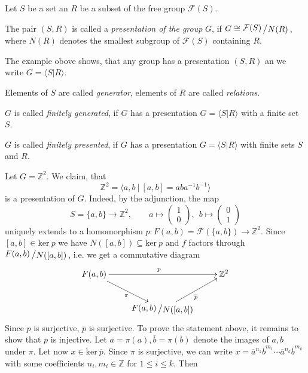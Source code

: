 \documentclass[11pt]{book}
\numberwithin{dummy}{section}
\theoremstyle{nonumberbreak}
\newenvironment{defin}[1][]{\ifthenelse{\equal{#1}{}}{\definition}{\definition[#1]}\rm}{\enddefinition}
\newenvironment{ex}[1][]{\ifthenelse{\equal{#1}{}}{\example}{\example[#1]}\rm}{\endexample}
\newcommand{\kernel}{\mathrm{ker}\ }
\newcommand{\F}{\mathcal{F}}
\newcommand{\la}{\longrightarrow}
\newcommand{\slant}[2]{{\raisebox{.1em}{$#1$}\left/\raisebox{-.1em}{$#2$}\right.}}
\begin{document}
\begin{spacing}{1.4}
\begin{defin}   %
Let $S$ be a set an $R$ be a subset of the free group $\F(S)$.
\begin{compactenum}
\item The pair $(S,R)$ is called a \textit{presentation of the group} $G$, if $G \cong \slant{\F(S)}{N(R)}$, where $N(R)$ denotes the smallest subgroup of $\F(S)$ containing $R$.
\item The example obove shows, that any group has a presentation $(S,R)$ an we write $G= \langle S\vert R\rangle$.
\item Elements of $S$ are called \textit{generator}, elements of $R$ are called \textit{relations}.
\item $G$ is called \textit{finitely generated}, if $G$ has a presentation $G=\langle S \vert R\rangle$ with a finite set $S$.
\item $G$ is called \textit{finitely presented}, if $G$ has a presentation $G=\langle S \vert R\rangle$ with finite sets $S$ and $R$.

\end{compactenum}

\end{defin}



\begin{ex}   %
Let $G= \mathbb{Z}^2$. We claim, that
$$\mathbb{Z}^2 = \langle a,b \ \vert \ [a,b]=aba^{-1}b^{-1} \rangle$$
is a presentation of $G$. Indeed, by the adjunction, the map
$$S=\{a,b\} \la \mathbb{Z}^2 , \qquad a \mapsto \begin{pmatrix}1\\[-6pt]0\end{pmatrix}, \ \ b \mapsto \begin{pmatrix}0\\[-6pt]1\end{pmatrix}$$
uniquely extends to a homomorphism $p: F(a,b) = \F(\{a,b\}) \la \mathbb{Z}^2$. Since $[a,b] \in \kernel p$ we have $N([a,b]) \subseteq \kernel p$ and $f$ factors through $\slant{F(a,b)}{N([a,b])}$, i.e. we get a commutative diagram
$$
\begin{xy}
\xymatrix{
F(a,b) \ar[rr]^{p} \ar[rd]_{\pi} && \mathbb{Z}^2 \\ & \slant{F(a,b)}{N([a,b])} \ar[ru]_{\overline{p}} & 
}
\end{xy}
$$
Since $p$ is surjective, $\overline{p}$ is surjective. To prove the statement above, it remains to show that $\overline{p}$ is injective. Let $\overline{a}=\pi(a), \overline{b}=\pi(b)$ denote the images of $a,b$ under $\pi$. Let now $x \in \kernel \overline{p}$. Since $\pi$ is surjective, we can write $x= \overline{a}^{n_1}\overline{b}^{m_1} \cdots \overline{a}^{n_k} \overline{b}^{m_k}$ with some coefficients $n_i, m_i \in \mathbb{Z}$ for $1 \leqslant i \leqslant k$. Then


\end{ex}
\end{spacing}
\end{document}
